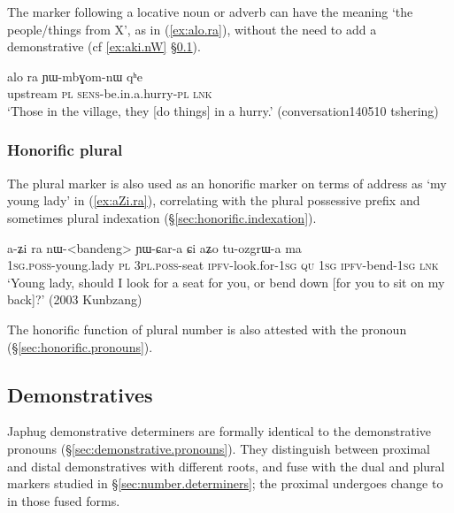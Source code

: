 The marker  following a locative noun or adverb can have the meaning `the people/things from X', as in (\ref{ex:alo.ra}), without the need to add a demonstrative (cf \ref{ex:aki.nW} §\ref{sec:demonstrative.determiners}).

\begin{exe}
\ex \label{ex:alo.ra}
 \gll alo ra ɲɯ-mbɣom-nɯ qʰe \\
 upstream \textsc{pl} \textsc{sens}-be.in.a.hurry-\textsc{pl} \textsc{lnk} \\
 \glt `Those in the village, they [do things] in a hurry.' (conversation140510 tshering)
\end{exe}

\subsubsection{Honorific plural} \label{sec:ra.honorific}
The plural marker  is also used as an honorific marker on terms of address as  `my young lady' in (\ref{ex:aZi.ra}), correlating with the plural possessive prefix  and sometimes plural indexation (§\ref{sec:honorific.indexation}).

\begin{exe}
\ex \label{ex:aZi.ra}
 \gll a-ʑi ra nɯ-<bandeng> ɲɯ-ɕar-a ɕi aʑo tu-ozgrɯ-a ma \\
\textsc{1sg}.\textsc{poss}-young.lady \textsc{pl} \textsc{3pl}.\textsc{poss}-seat \textsc{ipfv}-look.for-\textsc{1sg} \textsc{qu} \textsc{1sg} \textsc{ipfv}-bend-\textsc{1sg} \textsc{lnk} \\
\glt `Young lady, should I look for a seat for you, or bend down [for you to sit on my back]?' (2003 Kunbzang)
\end{exe}

The honorific function of plural number is also attested with the pronoun  (§\ref{sec:honorific.pronouns}).

\subsection{Demonstratives} \label{sec:demonstrative.determiners}
Japhug demonstrative determiners are formally identical  to the demonstrative pronouns (§\ref{sec:demonstrative.pronouns}). They distinguish between proximal and distal demonstratives with different roots, and fuse with the dual and plural markers studied in §\ref{sec:number.determiners}; the proximal  undergoes change to  in those fused forms.

